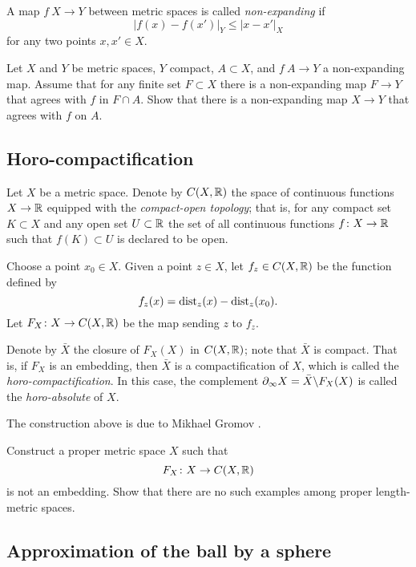 A map $f\: X\to Y$ between metric spaces is called \emph{non-expanding} if
\[|f(x)-f(x')|_Y\le |x-x'|_X\]
for any two points $x,x'\in X$.

\begin{pr}
Let $X$ and $Y$ be metric spaces, 
$Y$ compact,
$A\subset X$,
and $f\:A\to Y$ a non-expanding map.
Assume that for any finite set $F\subset X$ there is a non-expanding map $F \to Y$
that agrees with $f$ in $F\cap A$.
Show that there is a non-expanding map $X\to  Y$ that agrees with $f$ on $A$.
\end{pr}


\subsection*{Horo-compactification\easy}
\label{Horocompactification}

Let $X$ be a metric space.
Denote by $C(X,\mathbb{R})$ the space of continuous functions $X\to \mathbb{R}$
equipped with the \emph{compact-open topology};
that is, for any compact set $K\subset X$ and any open set $U\subset \mathbb{R}$
the set of all continuous functions $f\colon X\to \mathbb{R}$ such that $f(K)\subset U$
is declared to be open.

Choose a point $x_0\in X$.
Given a point $z\in X$, let $f_z\in C(X,\mathbb{R})$ be the function defined by 
\[f_z(x)=\operatorname{\rm dist}\nolimits_z(x)-\operatorname{\rm dist}\nolimits_z(x_0).\]
Let $F_X\colon X\to C(X,\mathbb{R})$ be the map 
sending $z$ to $f_z$.

Denote by $\bar X$ 
the closure of $F_X(X)$ in $C(X,\mathbb{R})$;
note that $\bar X$ is compact.
That is, 
if $F_X$ is an embedding, 
then $\bar X$ is a compactification of $X$,
which is called the \emph{horo-compactification}.
In this case, the complement 
$\partial_\infty X\z=\bar X\backslash F_X(X)$ 
is called the {}\emph{horo-absolute} of $X$.

The construction above is due to Mikhael Gromov \cite{gromov-hyperbolic}.

\begin{pr}
Construct a proper metric space $X$
such that 
\[F_X\colon X\to C(X,\mathbb{R})\] 
is not an embedding.
Show that there are no such examples among proper length-metric spaces.
\end{pr}

\subsection*{Approximation of the ball by a sphere}
\label{3-sphere is close to a ball}

